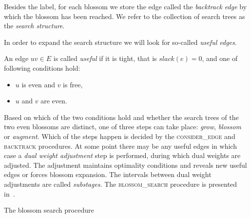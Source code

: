 Besides the label, for each blossom we store the edge called the \emph{backtrack edge} by which the blossom has been reached. We refer to the collection of search trees as the \emph{search structure}.

In order to expand the search structure we will look for so-called \emph{useful edges}.

\begin{defn}
    An edge $uv \in E$ is called \emph{useful} if it is tight, that is $slack(e) = 0$, and one of following conditions hold:

    \begin{itemize}
        \item $u$ is even and $v$ is free,
        \item $u$ and $v$ are even.
    \end{itemize}
\end{defn}

Based on which of the two conditions hold and whether the search trees of the two even blossoms are distinct, one of three steps can take place: \emph{grow}, \emph{blossom} or \emph{augment}. Which of the steps happen is decided by the \textsc{consider\_edge} and \textsc{backtrack} procedures. At some point there may be any useful edges in which case a \emph{dual weight adjustment} step is performed, during which dual weights are adjusted. The adjustment maintains optimality conditions and reveals new useful edges or forces blossom expansion. The intervals between dual weight adjustments are called \emph{substages}. The \textsc{blossom\_search} procedure is presented in~.

\begin{algorithm}
\caption{The blossom search procedure}\label{alg:blossom_search}
\begin{algorithmic}[1]
    \Else
    \EndIf
\EndFor
\State
{}
    \EndWhile
\EndWhile
\EndProcedure
\State
{}
\Else{}
\EndIf
\EndProcedure
\end{algorithmic}
\end{algorithm}

